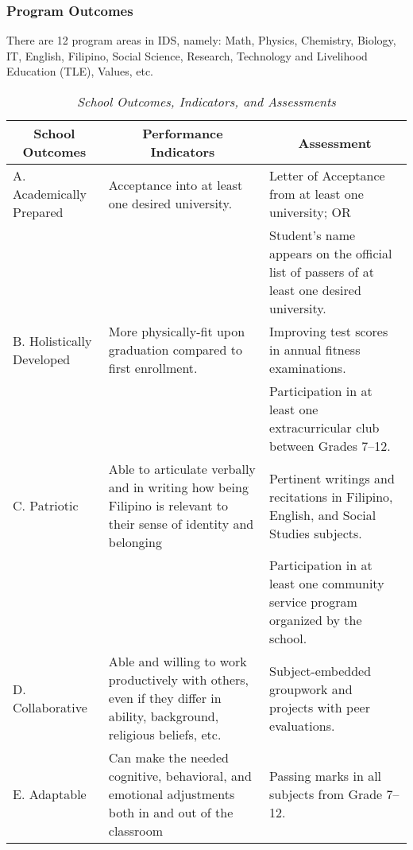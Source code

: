 \subsubsection{Program Outcomes}
There are 12 program areas in IDS, namely: Math, Physics, Chemistry, Biology, IT, English, Filipino, Social Science, Research, Technology and Livelihood Education (TLE), Values, etc.


\vspace{1em}
\begin{table}
\small
\renewcommand{\arraystretch}{1.6}
\begin{tabularx}{\textwidth}{X p{5.7cm} p{6cm}}

\multicolumn{1}{c}{\textbf{School Outcomes}} &	\multicolumn{1}{c}{\textbf{Performance Indicators}} & \multicolumn{1}{c}{\textbf{Assessment}}\\
\toprule
A. Academically Prepared & Acceptance into at least one desired university. & Letter of Acceptance from at least one university; OR\\

& & Student's name appears on the official list of passers of at least one desired university.\\
\midrule
B. Holistically Developed	& More physically-fit upon graduation compared to first enrollment. & Improving test scores in annual fitness examinations.\\

& & Participation in at least one extracurricular club between Grades 7--12.\\
\midrule
C. Patriotic	&	Able to articulate verbally and in writing how being Filipino is relevant to their sense of identity and belonging & Pertinent writings and recitations in Filipino, English, and Social Studies subjects.\\

& & Participation in at least one community service program organized by the school.\\
\midrule
D. Collaborative & Able and willing to work productively with others, even if they differ in ability, background, religious beliefs, etc. & Subject-embedded groupwork and projects with peer evaluations.\\
\midrule
E. Adaptable & Can make the needed cognitive, behavioral, and emotional adjustments both in and out of the classroom & Passing marks in all subjects from Grade 7--12.\\
\bottomrule
\end{tabularx} 
\caption{\textit{School Outcomes, Indicators, and Assessments}}
\label{table:1}
\end{table}

